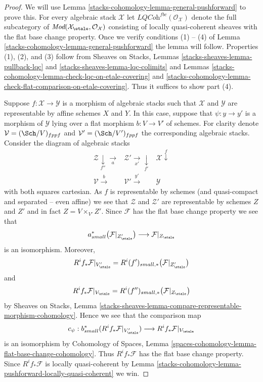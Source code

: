 \begin{proof}
We will use
Lemma \ref{stacks-cohomology-lemma-general-pushforward}
to prove this. For every algebraic stack $\mathcal{X}$ let
$\textit{LQCoh}^{fbc}(\mathcal{O}_\mathcal{X})$ denote the full subcategory of
$\textit{Mod}(\mathcal{X}_\etale, \mathcal{O}_\mathcal{X})$
consisting of locally quasi-coherent sheaves with the flat base
change property. Once we verify conditions (1) -- (4) of
Lemma \ref{stacks-cohomology-lemma-general-pushforward}
the lemma will follow. Properties (1), (2), and (3) follow from
Sheaves on Stacks, Lemmas \ref{stacks-sheaves-lemma-pullback-lqc} and
\ref{stacks-sheaves-lemma-lqc-colimits}
and
Lemmas \ref{stacks-cohomology-lemma-check-lqc-on-etale-covering} and
\ref{stacks-cohomology-lemma-check-flat-comparison-on-etale-covering}.
Thus it suffices to show part (4).

\medskip\noindent
Suppose $f : \mathcal{X} \to \mathcal{Y}$ is a morphism of algebraic stacks
such that $\mathcal{X}$ and $\mathcal{Y}$ are representable by affine
schemes $X$ and $Y$. In this case, suppose that
$\psi : y \to y'$ is a morphism of $\mathcal{Y}$ lying over
a flat morphism $b : V \to V'$ of schemes. For clarity denote
$\mathcal{V} = (\Sch/V)_{fppf}$ and $\mathcal{V}' = (\Sch/V')_{fppf}$
the corresponding algebraic stacks. Consider the diagram
of algebraic stacks
$$
\begin{array}{ccc}\mathcal{Z} \underset{f''}{\downarrow}\underset{a}{\longrightarrow} & \mathcal{Z}' \underset{x'}{\longrightarrow}\underset{f'}{\downarrow} & \mathcal{X} \overset{f}{\downarrow} \\ \mathcal{V} \overset{b}{\longrightarrow} & \mathcal{V}' \overset{y'}{\longrightarrow} & \mathcal{Y}\end{array}
$$
with both squares cartesian. As $f$ is representable by schemes
(and quasi-compact and separated -- even affine) we see that $\mathcal{Z}$ and
$\mathcal{Z}'$ are representable by schemes $Z$ and $Z'$ and in
fact $Z = V \times_{V'} Z'$. Since $\mathcal{F}$ has the flat
base change property we see that
$$
a_{small}^*\big(\mathcal{F}|_{Z'_\etale}\big)
\longrightarrow
\mathcal{F}|_{Z_\etale}
$$
is an isomorphism. Moreover,
$$
R^if_*\mathcal{F}|_{V'_\etale} =
R^i(f')_{small, *}\big(\mathcal{F}|_{Z'_\etale}\big)
$$
and
$$
R^if_*\mathcal{F}|_{V_\etale} =
R^i(f'')_{small, *}\big(\mathcal{F}|_{Z_\etale}\big)
$$
by
Sheaves on Stacks, Lemma
\ref{stacks-sheaves-lemma-compare-representable-morphism-cohomology}.
Hence we see that the comparison map
$$
c_\psi :
b_{small}^*(R^if_*\mathcal{F}|_{V'_\etale})
\longrightarrow
R^if_*\mathcal{F}|_{V_\etale}
$$
is an isomorphism by
Cohomology of Spaces, Lemma
\ref{spaces-cohomology-lemma-flat-base-change-cohomology}.
Thus $R^if_*\mathcal{F}$ has the flat base change property.
Since $R^if_*\mathcal{F}$ is locally quasi-coherent by
Lemma \ref{stacks-cohomology-lemma-pushforward-locally-quasi-coherent}
we win.
\end{proof}

